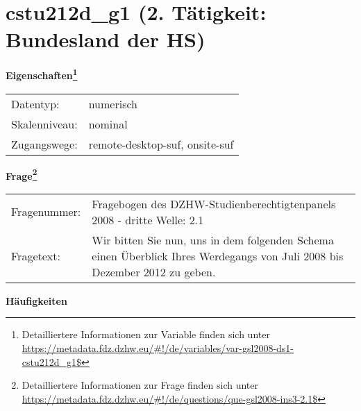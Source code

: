 
    \setcounter{footnote}{0}

    \vspace*{-1.8cm}
	\section{cstu212d\_g1 (2. Tätigkeit: Bundesland der HS)}
	\label{section:cstu212d_g1}



    \vspace*{0.5cm}
    \noindent\textbf{Eigenschaften\footnote{Detailliertere Informationen zur Variable finden sich unter
		\url{https://metadata.fdz.dzhw.eu/\#!/de/variables/var-gsl2008-ds1-cstu212d_g1$}}}\\
	\begin{tabularx}{\hsize}{@{}lX}
	Datentyp: & numerisch \\
	Skalenniveau: & nominal \\
	Zugangswege: &
	  remote-desktop-suf, 
	  onsite-suf
 \\
    \end{tabularx}



				\vspace*{0.5cm}
                \noindent\textbf{Frage\footnote{Detailliertere Informationen zur Frage finden sich unter
		              \url{https://metadata.fdz.dzhw.eu/\#!/de/questions/que-gsl2008-ins3-2.1$}}}\\
				\begin{tabularx}{\hsize}{@{}lX}
					Fragenummer: &
					  Fragebogen des DZHW-Studienberechtigtenpanels 2008 - dritte Welle:
					  2.1
 \\
					Fragetext: & Wir bitten Sie nun, uns in dem folgenden Schema einen Überblick Ihres Werdegangs von Juli 2008 bis Dezember 2012 zu geben. \\
				\end{tabularx}





        		\vspace*{0.5cm}
                \noindent\textbf{Häufigkeiten}

